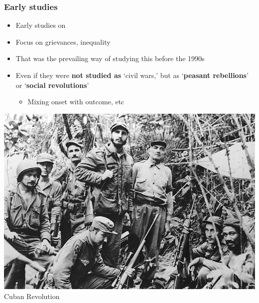 \documentclass[aspectratio=43]{beamer}
\begin{document}
\begin{frame}
\frametitle{Early studies}
\centering

\begin{minipage}{0.59\textwidth}\centering
\begin{itemize}
  \item Early studies on 
  \item Focus on grievances, inequality
  \item That was the prevailing way of studying this before the 1990s
  \item Even if they were \textbf{not studied as} `civil wars,' but as `\textbf{peasant rebellions}' or `\textbf{social revolutions}'
  \begin{itemize}
    \item Mixing onset with outcome, etc
  \end{itemize}
\end{itemize}
\end{minipage}\hfill
\begin{minipage}{0.39\textwidth}\centering
\includegraphics[width = \textwidth]{img/cuban}\\Cuban Revolution
\end{minipage}

\end{frame}
\end{document}
